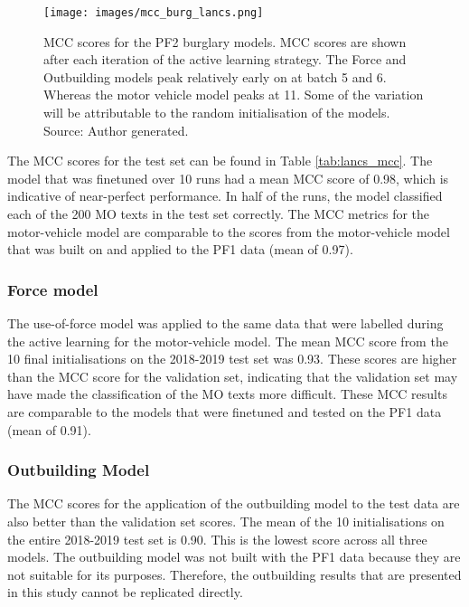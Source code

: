 \begin{figure}[!tbp]
  \centering
    \texttt{[image: images/mcc\_burg\_lancs.png]}
    \caption[MCC scores for the PF2 burglary models.]{{MCC scores for the PF2 burglary models.} MCC scores are shown after each iteration of the active learning strategy. The Force and Outbuilding models peak relatively early on at batch 5 and 6. Whereas the motor vehicle model peaks at 11. Some of the variation will be attributable to the random initialisation of the models. Source: Author generated.}
    \label{fig:mcc_burg_lancs}
\end{figure}


The MCC scores for the test set can be found in Table \ref{tab:lancs_mcc}. The model that was finetuned over 10 runs had a mean MCC score of 0.98, which is indicative of near-perfect performance. In half of the runs, the model classified each of the 200 MO texts in the test set correctly. The MCC metrics for the motor-vehicle model are comparable to the scores from the motor-vehicle model that was built on and applied to the PF1 data (mean of 0.97).

\subsubsection{Force model} The use-of-force model was applied to the same data that were labelled during the active learning for the motor-vehicle model. The mean MCC score from the 10 final initialisations on the 2018-2019 test set was 0.93. These scores are higher than the MCC score for the validation set, indicating that the validation set may have made the classification of the MO texts more difficult. These MCC results are comparable to the models that were finetuned and tested on the PF1 data (mean of 0.91).


\subsubsection{Outbuilding Model} The MCC scores for the application of the outbuilding model to the test data are also better than the validation set scores. The mean of the 10 initialisations on the entire 2018-2019 test set is 0.90. This is the lowest score across all three models. The outbuilding model was not built with the PF1 data because they are not suitable for its purposes. Therefore, the outbuilding results that are presented in this study cannot be replicated directly.



